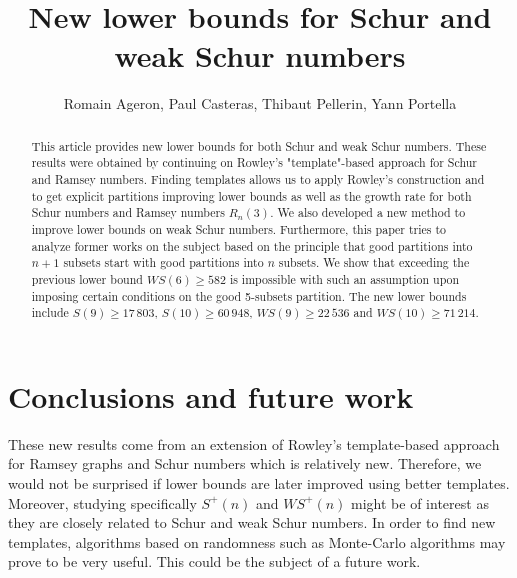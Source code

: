 \documentclass{article}
\title{New lower bounds for Schur and weak Schur numbers}
\author{Romain Ageron, Paul Casteras, Thibaut Pellerin, Yann Portella}
\newtheorem{computational theorem}{Computational Theorem}[section]
\newcommand{\WS}{\mathit{WS}}
\begin{document}
\maketitle

\begin{abstract}

This article provides new lower bounds for both Schur and weak Schur numbers. These results were obtained by 
continuing on Rowley's "template"-based approach for Schur and Ramsey numbers. Finding templates allows us to 
apply Rowley's construction and to get explicit partitions improving lower bounds as well as the growth rate for 
both Schur numbers and Ramsey numbers \(R_n(3)\). We also developed a new method to improve lower bounds on 
weak Schur numbers. Furthermore, this paper tries to analyze former works on the subject based on the principle 
that good partitions into \(n+1\) subsets start with good partitions into \(n\) subsets. We show that exceeding the 
previous lower bound \(\WS (6) \geqslant 582\) is impossible with such an assumption upon imposing certain conditions 
on the good 5-subsets partition. The new lower bounds include \(S(9) \geqslant 17\,803\), \(S(10) \geqslant 60\,948\),
\(\WS (9) \geqslant 22\,536 \) and \(\WS (10) \geqslant 71\,214 \).

\end{abstract}




% 








\section{Conclusions and future work}

\qquad These new results come from an extension of Rowley's template-based approach for Ramsey graphs and 
Schur numbers which is relatively new. Therefore, we would not be surprised if lower bounds are later improved 
using better templates. Moreover, studying specifically \(S^+(n)\) and \(\WS^+(n)\) might be of interest as they
 are closely related to Schur and weak Schur numbers. In order to find new templates, algorithms based on 
randomness such as Monte-Carlo algorithms may prove to be very useful. This could be the subject of a future work.
\end{document}
